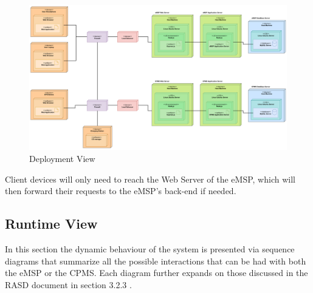 \documentclass[11pt]{article}
\begin{document}
\begin{figure}[!ht]
    \centering
    \includegraphics[page={1}, trim=0cm 0cm 0cm 0cm, width=\linewidth, clip]{DeploymentView.pdf}
    \caption{Deployment View}
\end{figure}
    
Client devices will only need to reach the Web Server of the eMSP, which will then forward their requests to the eMSP's back-end if needed.

\newpage

\subsection{Runtime View}

In this section the dynamic behaviour of the system is presented via sequence diagrams that summarize all the possible interactions that can be had with both the eMSP or the CPMS. Each diagram further expands on those discussed in the RASD document in section 3.2.3 .
\end{document}

